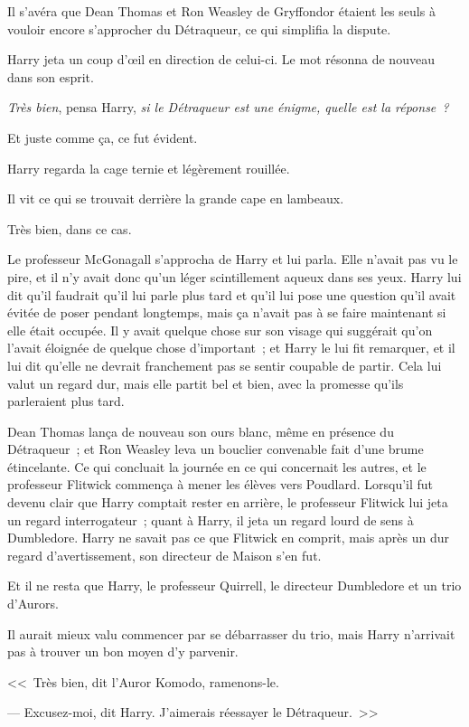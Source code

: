 Il s'avéra que Dean Thomas et Ron Weasley de Gryffondor étaient les seuls à vouloir encore s'approcher du Détraqueur, ce qui simplifia la dispute.

Harry jeta un coup d'œil en direction de celui-ci. Le mot résonna de nouveau dans son esprit.

\emph{Très bien}, pensa Harry, \emph{si le Détraqueur est une énigme, quelle est la réponse~?}

Et juste comme ça, ce fut évident.

Harry regarda la cage ternie et légèrement rouillée.

Il vit ce qui se trouvait derrière la grande cape en lambeaux.

Très bien, dans ce cas.

Le professeur McGonagall s'approcha de Harry et lui parla. Elle n'avait pas vu le pire, et il n'y avait donc qu'un léger scintillement aqueux dans ses yeux. Harry lui dit qu'il faudrait qu'il lui parle plus tard et qu'il lui pose une question qu'il avait évitée de poser pendant longtemps, mais ça n'avait pas à se faire maintenant si elle était occupée. Il y avait quelque chose sur son visage qui suggérait qu'on l'avait éloignée de quelque chose d'important~; et Harry le lui fit remarquer, et il lui dit qu'elle ne devrait franchement pas se sentir coupable de partir. Cela lui valut un regard dur, mais elle partit bel et bien, avec la promesse qu'ils parleraient plus tard.

Dean Thomas lança de nouveau son ours blanc, même en présence du Détraqueur~; et Ron Weasley leva un bouclier convenable fait d'une brume étincelante. Ce qui concluait la journée en ce qui concernait les autres, et le professeur Flitwick commença à mener les élèves vers Poudlard. Lorsqu'il fut devenu clair que Harry comptait rester en arrière, le professeur Flitwick lui jeta un regard interrogateur~; quant à Harry, il jeta un regard lourd de sens à Dumbledore. Harry ne savait pas ce que Flitwick en comprit, mais après un dur regard d'avertissement, son directeur de Maison s'en fut.

Et il ne resta que Harry, le professeur Quirrell, le directeur Dumbledore et un trio d'Aurors.

Il aurait mieux valu commencer par se débarrasser du trio, mais Harry n'arrivait pas à trouver un bon moyen d'y parvenir.

<<~Très bien, dit l'Auror Komodo, ramenons-le.

--- Excusez-moi, dit Harry. J'aimerais réessayer le Détraqueur.~>>

